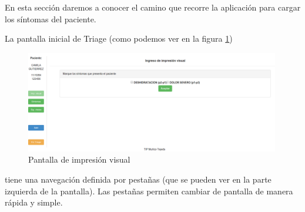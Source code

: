 En esta sección daremos a conocer el camino que recorre la aplicación para cargar los síntomas del paciente.

La pantalla inicial de Triage (como podemos ver en la figura \ref{fig:triage_inicial}) 
\begin{figure}
\centerline{\includegraphics[width=0.99\textwidth]{impresion_visual.png}}
\caption{Pantalla de impresión visual} \label{fig:triage_inicial}
\end{figure}
tiene una navegación definida por pestañas (que se pueden ver en la parte izquierda de la pantalla). Las pestañas permiten cambiar de pantalla de manera rápida y simple.

